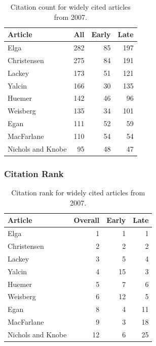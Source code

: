 \documentclass[
  10pt,
  letterpaper,
  DIV=11,
  numbers=noendperiod,
  twoside]{scrartcl}
\begin{document}
\begin{longtable}[]{@{}lrrr@{}}

\caption{\label{tbl-citation-count-2007}Citation count for widely cited
articles from 2007.}

\tabularnewline

\toprule\noalign{}
Article & All & Early & Late \\
\midrule\noalign{}
\endhead
\bottomrule\noalign{}
\endlastfoot
Elga & 282 & 85 & 197 \\
Christensen & 275 & 84 & 191 \\
Lackey & 173 & 51 & 121 \\
Yalcin & 166 & 30 & 135 \\
Huemer & 142 & 46 & 96 \\
Weisberg & 135 & 34 & 101 \\
Egan & 111 & 52 & 59 \\
MacFarlane & 110 & 54 & 54 \\
Nichols and Knobe & 95 & 48 & 47 \\

\end{longtable}

\subsubsection*{Citation Rank}\label{sec-rank-2007}

\begin{longtable}[]{@{}lrrr@{}}

\caption{\label{tbl-citation-rank-2007}Citation rank for widely cited
articles from 2007.}

\tabularnewline

\toprule\noalign{}
Article & Overall & Early & Late \\
\midrule\noalign{}
\endhead
\bottomrule\noalign{}
\endlastfoot
Elga & 1 & 1 & 1 \\
Christensen & 2 & 2 & 2 \\
Lackey & 3 & 5 & 4 \\
Yalcin & 4 & 15 & 3 \\
Huemer & 5 & 7 & 6 \\
Weisberg & 6 & 12 & 5 \\
Egan & 8 & 4 & 11 \\
MacFarlane & 9 & 3 & 18 \\
Nichols and Knobe & 12 & 6 & 25 \\

\end{longtable}
\end{document}
